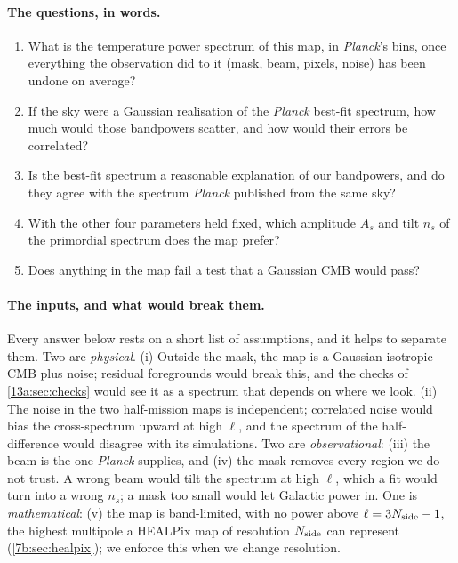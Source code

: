 \paragraph{The questions, in words.}
\begin{enumerate}[label=(\alph*),itemsep=2pt,leftmargin=2em]
  \item What is the temperature power spectrum of this map, in \textit{Planck}'s bins, once everything the
        observation did to it (mask, beam, pixels, noise) has been undone on average?
  \item If the sky were a Gaussian realisation of the \textit{Planck} best-fit spectrum, how much would
        those bandpowers scatter, and how would their errors be correlated?
  \item Is the best-fit spectrum a reasonable explanation of our bandpowers, and do they agree with the
        spectrum \textit{Planck} published from the same sky?
  \item With the other four parameters held fixed, which amplitude $A_s$ and tilt $n_s$ of the primordial
        spectrum does the map prefer?
  \item Does anything in the map fail a test that a Gaussian CMB would pass?
\end{enumerate}

\paragraph{The inputs, and what would break them.} Every answer below rests on a short list of
assumptions, and it helps to separate them. Two are \emph{physical}. (i) Outside the mask, the map is a
Gaussian isotropic CMB plus noise; residual foregrounds would break this, and the checks of
\cref{13a:sec:checks} would see it as a spectrum that depends on where we look. (ii) The noise in the two
half-mission maps is independent; correlated noise would bias the cross-spectrum upward at high $\ell$, and
the spectrum of the half-difference would disagree with its simulations. Two are \emph{observational}:
(iii) the beam is the one \textit{Planck} supplies, and (iv) the mask removes every region we do not trust.
A wrong beam would tilt the spectrum at high $\ell$, which a fit would turn into a wrong $n_s$; a mask too
small would let Galactic power in. One is \emph{mathematical}: (v) the map is band-limited, with no power
above $\ell=3N_{\rm side}-1$, the highest multipole a HEALPix map of resolution $N_{\rm side}$ can represent
(\cref{7b:sec:healpix}); we enforce this when we change resolution.

